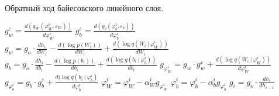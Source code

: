 \begin{algorithm}
\caption{Обратный ход байесовского линейного слоя.}
\begin{algorithmic}
    \State $g_w^\varepsilon = \frac{d(g_{W}(\varphi_W^i, \varepsilon_W))}{d \varphi_W^i}$
    \State $g_b^\varepsilon = \frac{d(g_{b}(\varphi_b^i, \varepsilon_b))}{d \varphi_b^i}$
    \State $g_w = g_o \cdot \frac{dh_i}{dW_i} - \frac{d(\log p(W_i))}{dW_i} + \frac{d(\log q(W_i\ |\ \varphi_W^i))}{dW_i}$
    \State $g_b = g_o \cdot \frac{dh_i}{db_i} - \frac{d(\log p(b_i))}{db_i} + \frac{d(\log q(b_i\ |\ \varphi_b^i))}{db_i}$
    \State $g_{\varphi_W^i} = g_w \cdot g_w^\varepsilon + \frac{d(\log q(W_i\ |\ \varphi_W^i))}{d\varphi_W^i}$
    \State $g_{\varphi_b^i} = g_b \cdot g_b^\varepsilon + \frac{d(\log q(b_i\ |\ \varphi_b^i)}{d\varphi_b^i}$
    \State $\varphi_W^i = \varphi_W^i - \alpha_W^i g_{\varphi_W^i}$
    \State $\varphi_b^i = \varphi_b^i - \alpha_b^i g_{\varphi_b^i}$
    \State $g_i = g_o \cdot \frac{dh_i}{dh_{i-1}}$
    \State {}
\EndProcedure
\end{algorithmic}
\end{algorithm}
